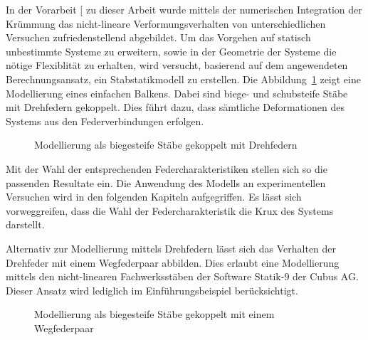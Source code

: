 \documentclass[
  11pt,
  letterpaper,
]{scrreprt}
\begin{document}
In der Vorarbeit {[}\citeproc{ref-gitz_ansatze_2024}{1}{]} zu dieser
Arbeit wurde mittels der numerischen Integration der Krümmung das
nicht-lineare Verformungsverhalten von unterschiedlichen Versuchen
zufriedenstellend abgebildet. Um das Vorgehen auf statisch unbestimmte
Systeme zu erweitern, sowie in der Geometrie der Systeme die nötige
Flexiblität zu erhalten, wird versucht, basierend auf dem angewendeten
Berechnungsansatz, ein Stabstatikmodell zu erstellen. Die
Abbildung~\ref{fig-modell_drehfeder} zeigt eine Modellierung eines
einfachen Balkens. Dabei sind biege- und schubsteife Stäbe mit
Drehfedern gekoppelt. Dies führt dazu, dass sämtliche Deformationen des
Systems aus den Federverbindungen erfolgen.

\begin{figure}[H]


\caption{\label{fig-modell_drehfeder}Modellierung als biegesteife Stäbe
gekoppelt mit Drehfedern}

\end{figure}%

Mit der Wahl der entsprechenden Federcharakteristiken stellen sich so
die passenden Resultate ein. Die Anwendung des Modells an
experimentellen Versuchen wird in den folgenden Kapiteln aufgegriffen.
Es lässt sich vorweggreifen, dass die Wahl der Federcharakteristik die
Krux des Systems darstellt.

Alternativ zur Modellierung mittels Drehfedern lässt sich das Verhalten
der Drehfeder mit einem Wegfederpaar abbilden. Dies erlaubt eine
Modellierung mittels den nicht-linearen Fachwerksstäben der Software
Statik-9 der Cubus AG. Dieser Ansatz wird lediglich im
Einführungsbeispiel berücksichtigt.

\begin{figure}[H]


\caption{\label{fig-modell_wegfeder}Modellierung als biegesteife Stäbe
gekoppelt mit einem Wegfederpaar}

\end{figure}%
\end{document}
